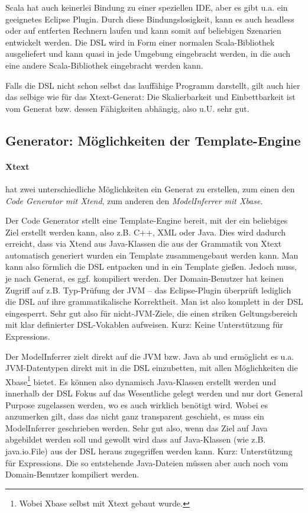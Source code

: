 Scala hat auch keinerlei Bindung zu einer speziellen IDE, aber es gibt
u.a. ein geeignetes Eclipse Plugin. Durch diese Bindungslosigkeit, kann
es auch headless oder auf entferten Rechnern laufen und kann somit auf
beliebigen Szenarien entwickelt werden.
Die DSL wird in Form einer normalen Scala-Bibliothek ausgeliefert und
kann quasi in jede Umgebung eingebracht werden, in die auch eine andere
Scala-Bibliothek eingebracht werden kann.

Falls die DSL nicht schon selbst das lauffähige Programm darstellt, gilt
auch hier das selbige wie für das Xtext-Generat: Die Skalierbarkeit und
Einbettbarkeit ist vom Generat bzw. dessen Fähigkeiten abhängig, also u.U.
sehr gut.


\subsection{Generator: Möglichkeiten der Template-Engine}\label{sec-generator}

\paragraph{Xtext} hat zwei unterschiedliche Möglichkeiten ein
Generat zu erstellen, zum einen den \emph{Code Generator mit Xtend},
zum anderen den \emph{ModelInferrer mit Xbase}.

Der Code Generator stellt eine Template-Engine bereit, mit der
ein beliebiges Ziel erstellt werden kann, also z.B. C++, XML oder Java.
Dies wird dadurch erreicht, dass via Xtend aus Java-Klassen die aus der
Grammatik von Xtext automatisch generiert wurden ein Template zusammengebaut
werden kann. Man kann also förmlich die DSL entpacken und in ein Template
gießen.
Jedoch muss, je nach Generat, es ggf. kompiliert werden. Der
Domain-Benutzer hat keinen Zugriff auf z.B. Typ-Prüfung der JVM --
das Eclipse-Plugin überprüft lediglich die DSL auf ihre
grammatikalische Korrektheit. Man ist also komplett in der DSL eingesperrt.
Sehr gut also für nicht-JVM-Ziele, die einen striken Geltungsbereich mit
klar definierter DSL-Vokablen aufweisen. Kurz: Keine Unterstützung für
Expressions.

Der ModelInferrer zielt direkt auf die JVM bzw. Java ab und ermöglicht es
u.a. JVM-Datentypen direkt mit in die DSL einzubetten, mit allen Möglichkeiten
die Xbase\footnote{Wobei Xbase selbst mit Xtext gebaut wurde.}
bietet. Es können also dynamisch Java-Klassen erstellt werden und innerhalb
der DSL Fokus auf das Wesentliche gelegt werden und nur dort General Purpose
zugelassen werden, wo es auch wirklich benötigt wird.
Wobei es anzumerken gilt, dass das nicht ganz transparent geschieht,
es muss ein ModelInferrer geschrieben werden.
Sehr gut also, wenn das Ziel auf Java abgebildet werden soll und gewollt wird
dass auf Java-Klassen (wie z.B. java.io.File) aus der DSL heraus
zugegriffen werden kann. Kurz: Unterstützung für Expressions.
Die so entstehende Java-Dateien müssen aber auch noch vom Domain-Benutzer
kompiliert werden.\cite{xtext}

